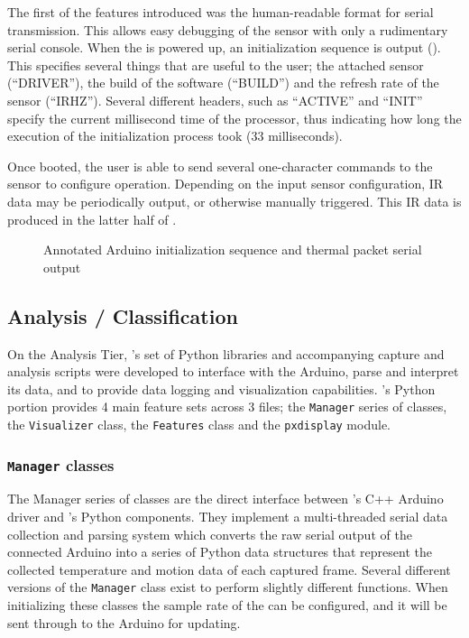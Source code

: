 \documentclass[../thesis/thesis.tex]{subfiles}
\begin{document}
The first of the features introduced was the human-readable format for serial transmission. This allows easy debugging of the sensor with only a rudimentary serial console. When the \ard is powered up, an initialization sequence is output (). This specifies several things that are useful to the user; the attached sensor (``DRIVER''), the build of the software (``BUILD'') and the refresh rate of the sensor (``IRHZ''). Several different headers, such as ``ACTIVE'' and ``INIT'' specify the current millisecond time of the processor, thus indicating how long the execution of the initialization process took (33 milliseconds).

Once booted, the user is able to send several one-character commands to the sensor to configure operation. Depending on the input sensor configuration, IR data may be periodically output, or otherwise manually triggered. This IR data is produced in the latter half of .

\begin{figure}
 \centering

\caption{Annotated Arduino initialization sequence and thermal packet serial output}
\label{fig:code:initseq}
\end{figure}

\subsection{Analysis / Classification}

On the Analysis Tier, \tarl's set of Python libraries and accompanying capture and analysis scripts were developed to interface with the Arduino, parse and interpret its data, and to provide data logging and visualization capabilities. \tarl's Python portion provides 4 main feature sets across 3 files; the \texttt{Manager} series of classes, the \texttt{Visualizer} class, the \texttt{Features} class and the \texttt{pxdisplay} module.

\subsubsection*{\texttt{Manager} classes}
The Manager series of classes are the direct interface between \tarl's C++ Arduino driver and \tarl's Python components. They implement a multi-threaded serial data collection and parsing system which converts the raw serial output of the connected Arduino into a series of Python data structures that represent the collected temperature and motion data of each captured frame. Several different versions of the \texttt{Manager} class exist to perform slightly different functions. When initializing these classes the sample rate of the \mlx can be configured, and it will be sent through to the Arduino for updating.
\end{document}
